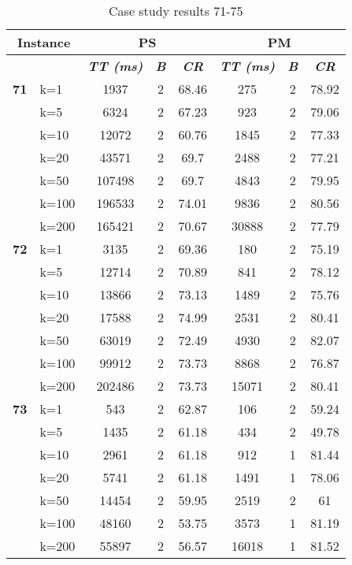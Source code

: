     \begin{table}[htbp]
    \caption{Case study results 71-75}
    \centering
    \begin{tabular}{|l|l|c|c|c|c|c|c|}
    \hline
    \multicolumn{ 2}{|c|}{\textbf{Instance}} & \multicolumn{ 3}{c|}{\textbf{PS}} & \multicolumn{ 3}{c|}{\textbf{PM}} \\ \hline
    \multicolumn{ 2}{|l|}{} & \textbf{\textit{TT (ms)}} & \textbf{\textit{B}} & \textbf{\textit{CR}} & \textbf{\textit{TT (ms)}} & \textbf{\textit{B}} & \textbf{\textit{CR}} \\ \hline
    \multicolumn{1}{|r|}{\textbf{71}} & k=1 & 1937 & 2 & 68.46 & 275 & 2 & 78.92 \\ 
     & k=5 & 6324 & 2 & 67.23 & 923 & 2 & 79.06 \\ 
     & k=10 & 12072 & 2 & 60.76 & 1845 & 2 & 77.33 \\ 
     & k=20 & 43571 & 2 & 69.7 & 2488 & 2 & 77.21 \\ 
     & k=50 & 107498 & 2 & 69.7 & 4843 & 2 & 79.95 \\ 
     & k=100 & 196533 & 2 & 74.01 & 9836 & 2 & 80.56 \\ 
     & k=200 & 165421 & 2 & 70.67 & 30888 & 2 & 77.79 \\ \hline
    \multicolumn{1}{|r|}{\textbf{72}} & k=1 & 3135 & 2 & 69.36 & 180 & 2 & 75.19 \\ 
     & k=5 & 12714 & 2 & 70.89 & 841 & 2 & 78.12 \\ 
     & k=10 & 13866 & 2 & 73.13 & 1489 & 2 & 75.76 \\ 
     & k=20 & 17588 & 2 & 74.99 & 2531 & 2 & 80.41 \\ 
     & k=50 & 63019 & 2 & 72.49 & 4930 & 2 & 82.07 \\ 
     & k=100 & 99912 & 2 & 73.73 & 8868 & 2 & 76.87 \\ 
     & k=200 & 202486 & 2 & 73.73 & 15071 & 2 & 80.41 \\ \hline
    \multicolumn{1}{|r|}{\textbf{73}} & k=1 & 543 & 2 & 62.87 & 106 & 2 & 59.24 \\ 
     & k=5 & 1435 & 2 & 61.18 & 434 & 2 & 49.78 \\ 
     & k=10 & 2961 & 2 & 61.18 & 912 & 1 & 81.44 \\ 
     & k=20 & 5741 & 2 & 61.18 & 1491 & 1 & 78.06 \\ 
     & k=50 & 14454 & 2 & 59.95 & 2519 & 2 & 61 \\ 
     & k=100 & 48160 & 2 & 53.75 & 3573 & 1 & 81.19 \\ 
     & k=200 & 55897 & 2 & 56.57 & 16018 & 1 & 81.52 \\ \hline

\end{tabular}
\end{table}
